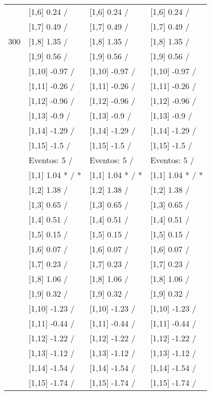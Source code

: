 \begin{table}
\begin{tabular}[t]{llll}
 & {}[1,6] 0.24  / & {}[1,6] 0.24  / & {}[1,6] 0.24  /\\
 & {}[1,7] 0.49  / & {}[1,7] 0.49  / & {}[1,7] 0.49  /\\
300 & {}[1,8] 1.35  / & {}[1,8] 1.35  / & {}[1,8] 1.35  /\\
\addlinespace
 & {}[1,9] 0.56  / & {}[1,9] 0.56  / & {}[1,9] 0.56  /\\
 & {}[1,10] -0.97  / & {}[1,10] -0.97  / & {}[1,10] -0.97  /\\
 & {}[1,11] -0.26  / & {}[1,11] -0.26  / & {}[1,11] -0.26  /\\
 & {}[1,12] -0.96  / & {}[1,12] -0.96  / & {}[1,12] -0.96  /\\
 & {}[1,13] -0.9  / & {}[1,13] -0.9  / & {}[1,13] -0.9  /\\
\addlinespace
 & {}[1,14] -1.29  / & {}[1,14] -1.29  / & {}[1,14] -1.29  /\\
 & {}[1,15] -1.5  / & {}[1,15] -1.5  / & {}[1,15] -1.5  /\\
 & Eventos:  5 / & Eventos:  5 / & Eventos:  5 /\\
 & {}[1,1] 1.04 * / * & {}[1,1] 1.04 * / * & {}[1,1] 1.04 * / *\\
 & {}[1,2] 1.38  / & {}[1,2] 1.38  / & {}[1,2] 1.38  /\\
\addlinespace
 & {}[1,3] 0.65  / & {}[1,3] 0.65  / & {}[1,3] 0.65  /\\
 & {}[1,4] 0.51  / & {}[1,4] 0.51  / & {}[1,4] 0.51  /\\
 & {}[1,5] 0.15  / & {}[1,5] 0.15  / & {}[1,5] 0.15  /\\
 & {}[1,6] 0.07  / & {}[1,6] 0.07  / & {}[1,6] 0.07  /\\
 & {}[1,7] 0.23  / & {}[1,7] 0.23  / & {}[1,7] 0.23  /\\
\addlinespace
500 & {}[1,8] 1.06  / & {}[1,8] 1.06  / & {}[1,8] 1.06  /\\
 & {}[1,9] 0.32  / & {}[1,9] 0.32  / & {}[1,9] 0.32  /\\
 & {}[1,10] -1.23  / & {}[1,10] -1.23  / & {}[1,10] -1.23  /\\
 & {}[1,11] -0.44  / & {}[1,11] -0.44  / & {}[1,11] -0.44  /\\
 & {}[1,12] -1.22  / & {}[1,12] -1.22  / & {}[1,12] -1.22  /\\
\addlinespace
 & {}[1,13] -1.12  / & {}[1,13] -1.12  / & {}[1,13] -1.12  /\\
 & {}[1,14] -1.54  / & {}[1,14] -1.54  / & {}[1,14] -1.54  /\\
 & {}[1,15] -1.74  / & {}[1,15] -1.74  / & {}[1,15] -1.74  /\\
\bottomrule
\end{tabular}
\end{table}
